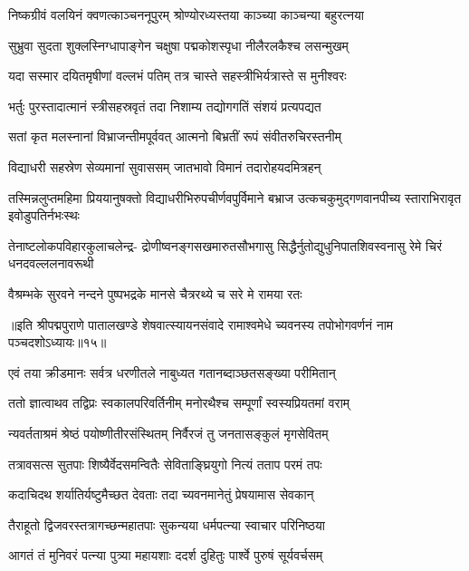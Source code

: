 \twolineshloka
{निष्कग्रीवं वलयिनं क्वणत्काञ्चननूपुरम्}
{श्रोण्योरध्यस्तया काञ्च्या काञ्चन्या बहुरत्नया}%

\twolineshloka
{सुभ्रुवा सुदता शुक्लस्निग्धापाङ्गेन चक्षुषा}
{पद्मकोशस्पृधा नीलैरलकैश्च लसन्मुखम्}%

\twolineshloka
{यदा सस्मार दयितमृषीणां वल्लभं पतिम्}
{तत्र चास्ते सहस्त्रीभिर्यत्रास्ते स मुनीश्वरः}%

\twolineshloka
{भर्तुः पुरस्तादात्मानं स्त्रीसहस्रवृतं तदा}
{निशाम्य तद्योगगतिं संशयं प्रत्यपद्यत}%

\twolineshloka
{सतां कृत मलस्नानां विभ्राजन्तीमपूर्ववत्}
{आत्मनो बिभ्रतीं रूपं संवीतरुचिरस्तनीम्}%

\twolineshloka
{विद्याधरी सहस्रेण सेव्यमानां सुवाससम्}
{जातभावो विमानं तदारोहयदमित्रहन्}%

\fourlineindentedshloka
{तस्मिन्नलुप्तमहिमा प्रिययानुषक्तो}
{विद्याधरीभिरुपचीर्णवपुर्विमाने}
{बभ्राज उत्कचकुमुद्गणवानपीच्य}
{स्ताराभिरावृत इवोडुपतिर्नभःस्थः}%

\fourlineindentedshloka
{तेनाष्टलोकपविहारकुलाचलेन्द्र-}
{द्रोणीष्वनङ्गसखमारुतसौभगासु}
{सिद्धैर्नुतोद्युधुनिपातशिवस्वनासु}
{रेमे चिरं धनदवल्ललनावरूथी}%

\twolineshloka
{वैश्रम्भके सुरवने नन्दने पुष्पभद्रके}
{मानसे चैत्ररथ्ये च सरे मे रामया रतः}%

{॥इति श्रीपद्मपुराणे पातालखण्डे शेषवात्स्यायनसंवादे रामाश्वमेधे च्यवनस्य तपोभोगवर्णनं नाम पञ्चदशोऽध्यायः॥१५॥}



\twolineshloka
{एवं तया क्रीडमानः सर्वत्र धरणीतले}
{नाबुध्यत गतानब्दाञ्छतसङ्ख्या परीमितान्}%

\twolineshloka
{ततो ज्ञात्वाथव तद्विप्रः स्वकालपरिवर्तिनीम्}
{मनोरथैश्च सम्पूर्णां स्वस्यप्रियतमां वराम्}%

\twolineshloka
{न्यवर्तताश्रमं श्रेष्ठं पयोष्णीतीरसंस्थितम्}
{निर्वैरजं तु जनतासङ्कुलं मृगसेवितम्}%

\twolineshloka
{तत्रावसत्स सुतपाः शिष्यैर्वेदसमन्वितैः}
{सेविताङ्घ्रियुगो नित्यं तताप परमं तपः}%

\twolineshloka
{कदाचिदथ शर्यातिर्यष्टुमैच्छत देवताः}
{तदा च्यवनमानेतुं प्रेषयामास सेवकान्}%

\twolineshloka
{तैराहूतो द्विजवरस्तत्रागच्छन्महातपाः}
{सुकन्यया धर्मपत्न्या स्वाचार परिनिष्ठया}%

\twolineshloka
{आगतं तं मुनिवरं पत्न्या पुत्र्या महायशाः}
{ददर्श दुहितुः पार्श्वे पुरुषं सूर्यवर्चसम्}%

